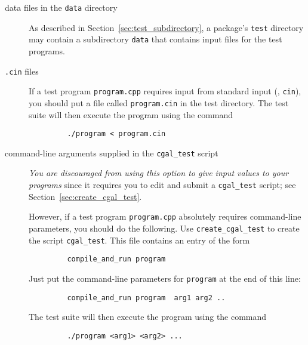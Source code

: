 \begin{description}
   \item[data files in the {\tt data} directory]
         As described in Section~\ref{sec:test_subdirectory}, a package's
         {\tt test} directory may contain a subdirectory {\tt data} that
         contains input files for the test programs.
   \item[{\tt *.cin} files]
         If a test program \texttt{program.cpp} requires input from standard 
         input (\ie, {\tt cin}), you should put a file called 
         \texttt{program.cin} in the test directory. 
         The test suite will then execute the program using the command
         \begin{verbatim}
         ./program < program.cin
         \end{verbatim}
   \item[command-line arguments supplied in the {\tt cgal\_test} script]
        {\em You are discouraged from using this option to give input values
        to your programs} since it requires you to edit and submit a 
        {\tt cgal\_test} script; see Section~\ref{sec:create_cgal_test}.

         However, if a test program \texttt{program.cpp} absolutely requires 
         command-line parameters, you should do the following. Use
         \texttt{create\_cgal\_test} to create the script \texttt{cgal\_test}.
         This file contains an entry of the form 
         \begin{verbatim}
         compile_and_run program 
         \end{verbatim}
         Just put the command-line 
         parameters for \texttt{program} at the end of this line: 
         \begin{verbatim}
         compile_and_run program  arg1 arg2 ..
         \end{verbatim}
         The test suite will then execute the program using the command

         \begin{verbatim}
         ./program <arg1> <arg2> ...
         \end{verbatim}
\end{description}


